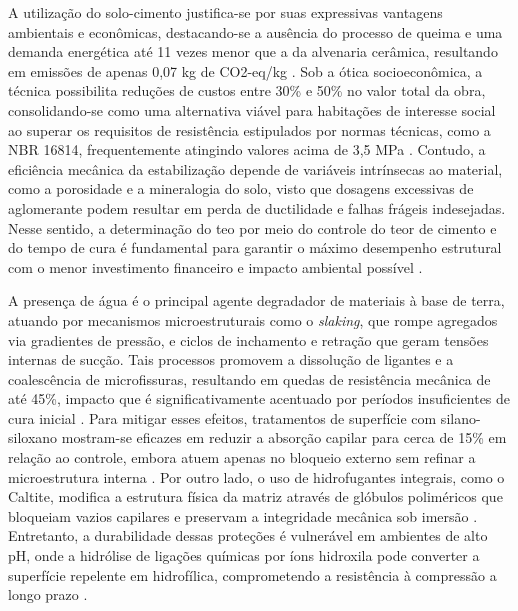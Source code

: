     A utilização do solo-cimento justifica-se por suas expressivas vantagens ambientais e econômicas, destacando-se a ausência do processo de queima e uma demanda energética até 11 vezes menor que a da alvenaria cerâmica, resultando em emissões de apenas 0,07 kg de CO2-eq/kg \cite{Barroso2019, Brito2023, Ibrahim2020}. Sob a ótica socioeconômica, a técnica possibilita reduções de custos entre 30\% e 50\% no valor total da obra, consolidando-se como uma alternativa viável para habitações de interesse social ao superar os requisitos de resistência estipulados por normas técnicas, como a NBR 16814, frequentemente atingindo valores acima de 3,5 MPa \cite{Ibrahim2020, Kariyawasam2016, Junior2020, Dao2018, Bogas2019}. Contudo, a eficiência mecânica da estabilização depende de variáveis intrínsecas ao material, como a porosidade e a mineralogia do solo, visto que dosagens excessivas de aglomerante podem resultar em perda de ductilidade e falhas frágeis indesejadas. Nesse sentido, a determinação do \gls{teo} por meio do controle do teor de cimento e do tempo de cura é fundamental para garantir o máximo desempenho estrutural com o menor investimento financeiro e impacto ambiental possível \cite{Santana2021}.


    A presença de água é o principal agente degradador de materiais à base de terra, atuando por mecanismos microestruturais como o \textit{slaking}, que rompe agregados via gradientes de pressão, e ciclos de inchamento e retração que geram tensões internas de sucção. Tais processos promovem a dissolução de ligantes e a coalescência de microfissuras, resultando em quedas de resistência mecânica de até 45\%, impacto que é significativamente acentuado por períodos insuficientes de cura inicial \cite{Hu2018, Liu2023, Ralf2025}. Para mitigar esses efeitos, tratamentos de superfície com silano-siloxano mostram-se eficazes em reduzir a absorção capilar para cerca de 15\% em relação ao controle, embora atuem apenas no bloqueio externo sem refinar a microestrutura interna \cite{Bogas2020}. Por outro lado, o uso de hidrofugantes integrais, como o Caltite, modifica a estrutura física da matriz através de glóbulos poliméricos que bloqueiam vazios capilares e preservam a integridade mecânica sob imersão \cite{Ezreig2022}. Entretanto, a durabilidade dessas proteções é vulnerável em ambientes de alto pH, onde a hidrólise de ligações químicas por íons hidroxila pode converter a superfície repelente em hidrofílica, comprometendo a resistência à compressão a longo prazo \cite{Guo2025}.

